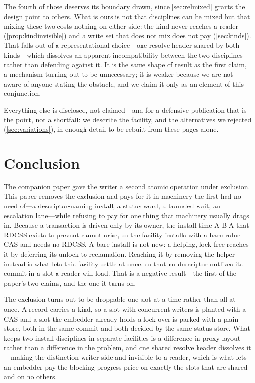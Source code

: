\documentclass[11pt]{article}
\begin{document}
The fourth of those deserves its boundary drawn, since \cref{sec:relmixed} grants
the design point to others. What is ours is not that disciplines can be mixed but
that mixing these two costs nothing on either side: the kind never reaches a
reader (\cref{prop:kindinvisible}) and a write set that does not mix does not pay
(\cref{sec:kinds}). That falls out of a representational choice---one resolve
header shared by both kinds---which dissolves an apparent incompatibility
between the two disciplines rather than defending against it. It is
the same shape of result as the first claim, a mechanism turning out to be
unnecessary; it is weaker because we are not aware of anyone stating the
obstacle, and we claim it only as an element of this conjunction.

Everything else is disclosed, not claimed---and for a defensive publication that
is the point, not a shortfall: we describe the facility, and the alternatives we
rejected (\cref{sec:variations}), in enough detail to be rebuilt from these pages
alone.

\section{Conclusion}
\label{sec:conclusion}

The companion paper gave the \rcu writer a second atomic operation under exclusion. This
paper removes the exclusion and pays for it in machinery the first had no need
of---a descriptor-naming install, a status word, a bounded wait, an escalation
lane---while refusing to pay for one thing that machinery usually drags in.
Because a transaction is driven only by its owner, the install-time A-B-A that
RDCSS exists to prevent cannot arise, so the facility installs with a bare
value-CAS and needs no RDCSS. A bare install is not new: a helping, lock-free
\kcas reaches it by deferring its unlock to reclamation. Reaching it by removing
the helper instead is what lets this facility settle at once, so that no
descriptor outlives its commit in a slot a reader will load. That is a negative
result---the first of the paper's two claims, and the one it turns on.

The exclusion turns out to be droppable one slot at a time rather than all at
once. A record carries a kind, so a slot with concurrent writers is planted with
a CAS and a slot the embedder already holds a lock over is parked with a plain
store, both in the same commit and both decided by the same status store. What
keeps two install disciplines in separate facilities is a difference in proxy
layout rather than a difference in the problem, and one shared resolve header
dissolves it---making the distinction writer-side and invisible to a reader,
which is what lets an embedder pay the blocking-progress price on exactly the
slots that are shared and on no others.
\end{document}
